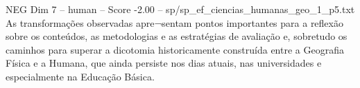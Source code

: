 \begin{textsample}{NEG Dim 7 – human – Score -2.00 – sp/sp\_ef\_ciencias\_humanas\_geo\_1\_p5.txt}  \label{ex:f7_neg_007}
As transformações observadas apre¬sentam pontos importantes para a reflexão sobre os conteúdos, as metodologias e as estratégias de avaliação e, sobretudo os caminhos para superar a dicotomia historicamente construída entre a Geografia Física e a Humana, que ainda persiste nos dias atuais, nas universidades e especialmente na Educação Básica.

\end{textsample}
